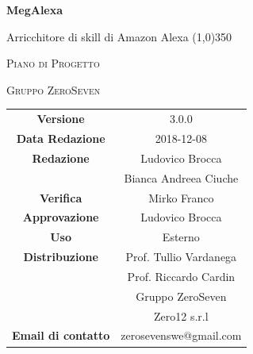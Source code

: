 \documentclass[a4paper,12pt, openany]{book}
\author{Mirko Franco}
\date{2018-11-26}
\begin{document}
\begin{titlepage}
	\centering
	{\huge\bfseries MegAlexa\par}
	Arricchitore di skill di Amazon Alexa
	\line(1,0){350} \\
	{\scshape\LARGE Piano di Progetto \par}
	\vspace{1cm}
	{\scshape Gruppo ZeroSeven \par}
	\logo
	\begin{tabular}{c|c}
		{\hfill \textbf{Versione}} 			& 3.0.0    \\
		{\hfill\textbf{Data Redazione}} 	& 2018-12-08\\ 
		{\hfill\textbf{Redazione}} 			&Ludovico Brocca\\ & Bianca Andreea Ciuche\\
		{\hfill\textbf{Verifica}} 		&  	Mirko Franco\\
		{\hfill\textbf{Approvazione}} 		&  		Ludovico Brocca	\\ 
		{\hfill\textbf{Uso}} 					& 		Esterno		\\ 
		{\hfill\textbf{Distribuzione}} 			& 			Prof. Tullio Vardanega \\ & Prof. Riccardo Cardin \\ & Gruppo ZeroSeven		\\ & Zero12 s.r.l \\ 
		{\hfill\textbf{Email di contatto}} & zerosevenswe@gmail.com \\
	\end{tabular}
\end{titlepage}
	\label{LastFrontPage}
	\newpage	
	
	\pagestyle{mymain}
	\tableofcontents
	\listoftables
	\listoffigures
	
	
	
	
	
	\begin{appendices}
		
		
	\end{appendices}
	\label{LastPage}
\end{document}
